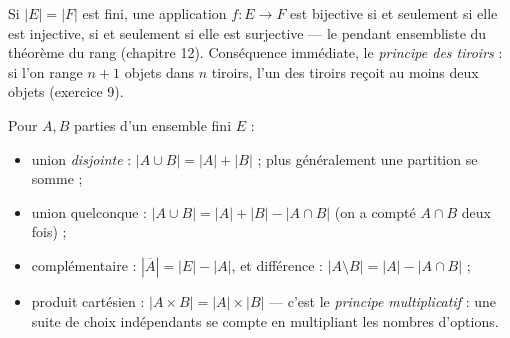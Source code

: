 \begin{theoreme}
Si $|E|=|F|$ est fini, une application $f:E\to F$ est bijective si et
seulement si elle est injective, si et seulement si elle est surjective —
le pendant ensembliste du théorème du rang (chapitre 12). Conséquence
immédiate, le \emph{principe des tiroirs} : si l'on range $n+1$ objets
dans $n$ tiroirs, l'un des tiroirs reçoit au moins deux objets
(exercice 9).
\end{theoreme}


\noindent
\begin{minipage}[c]{0.55\linewidth}
\begin{propriete}
Pour $A,B$ parties d'un ensemble fini $E$ :
\begin{itemize}[label={\color{otNavy}\textbullet},leftmargin=1.4em,itemsep=0.6mm,topsep=0.8mm]
  \item union \emph{disjointe} : $|A\cup B|=|A|+|B|$ ; plus généralement
    une partition se somme ;
  \item union quelconque :
    $|A\cup B|=|A|+|B|-|A\cap B|$ (on a compté $A\cap B$ deux fois) ;
  \item complémentaire : $|\overline A|=|E|-|A|$, et différence :
    $|A\setminus B|=|A|-|A\cap B|$ ;
  \item produit cartésien : $|A\times B|=|A|\times|B|$ — c'est le
    \emph{principe multiplicatif} : une suite de choix indépendants se
    compte en multipliant les nombres d'options.
\end{itemize}
\end{propriete}
\end{minipage}\hfill
\begin{minipage}[c]{0.41\linewidth}
\centering
{}\\[0.5mm]
\end{minipage}

